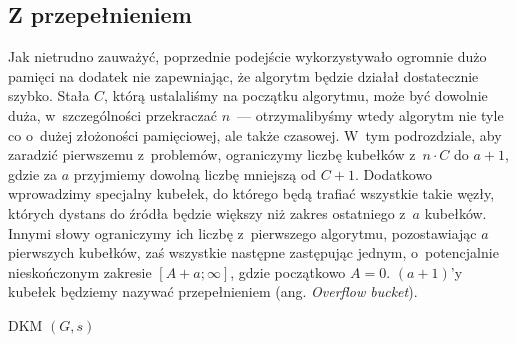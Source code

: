 \subsection{Z przepełnieniem}



Jak nietrudno zauważyć, poprzednie podejście wykorzystywało ogromnie dużo pamięci na dodatek nie zapewniając, że algorytm będzie działał dostatecznie szybko. Stała $C$, którą ustalaliśmy na początku algorytmu, może być dowolnie duża, w~szczególności przekraczać $n$~--- otrzymalibyśmy wtedy algorytm nie tyle co o~dużej złożoności pamięciowej, ale także czasowej.
W~tym podrozdziale, aby zaradzić pierwszemu z~problemów, ograniczymy liczbę kubełków z~$n \cdot C$ do $a + 1$, gdzie za $a$ przyjmiemy dowolną liczbę mniejszą od $C + 1$.
Dodatkowo wprowadzimy specjalny kubełek, do którego będą trafiać wszystkie takie węzły, których dystans do źródła będzie większy niż zakres ostatniego z~$a$ kubełków.
Innymi słowy ograniczymy ich liczbę z~pierwszego algorytmu, pozostawiając $a$ pierwszych kubełków, zaś wszystkie następne zastępując jednym, o~potencjalnie nieskończonym zakresie $\left [ A + a; \infty \right]$, gdzie początkowo $A = 0$.
$\left( a + 1 \right)$'y kubełek będziemy nazywać przepełnieniem (ang. \textit{Overflow bucket}).

\begin{pseudokod}[!htbp]
	\DontPrintSemicolon
	\caption{
		DKM $\left( G, s \right)$
	}
	\label{alg:OverflowBucket}
\end{pseudokod}

